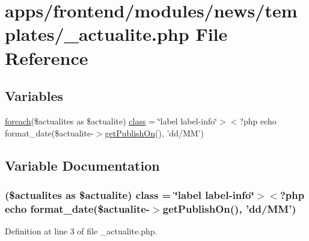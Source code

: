 \hypertarget{frontend_2modules_2news_2templates_2__actualite_8php}{\section{apps/frontend/modules/news/templates/\-\_\-actualite.php File Reference}
\label{frontend_2modules_2news_2templates_2__actualite_8php}
}
\subsection*{Variables}
\begin{DoxyCompactItemize}
\item 
\hyperlink{presse_2modules_2news_2templates_2index_success_8php_abc56db52b2e9a59bcd5c9e45ac5cb332}{foreach}(\$actualites as \$actualite) \hyperlink{frontend_2modules_2news_2templates_2__actualite_8php_ac7bdb08b69b5873cb914aadeb74b8a8f}{class} = \char`\"{}label label-\/info\char`\"{}$>$$<$?php echo format\-\_\-date(\$actualite-\/$>$\hyperlink{live_2modules_2news_2templates_2index_success_8php_a3c158fe87c824684f8b25431b03eb836}{get\-Publish\-On}(), 'dd/M\-M')
\end{DoxyCompactItemize}


\subsection{Variable Documentation}
\hypertarget{frontend_2modules_2news_2templates_2__actualite_8php_ac7bdb08b69b5873cb914aadeb74b8a8f}{
\subsubsection[{class}]{ (\$actualites as \$actualite) class = \char`\"{}label label-\/info\char`\"{}$>$$<$?php echo format\-\_\-date(\$actualite-\/$>${\bf get\-Publish\-On}(), 'dd/M\-M')}}\label{frontend_2modules_2news_2templates_2__actualite_8php_ac7bdb08b69b5873cb914aadeb74b8a8f}


Definition at line 3 of file \-\_\-actualite.\-php.

